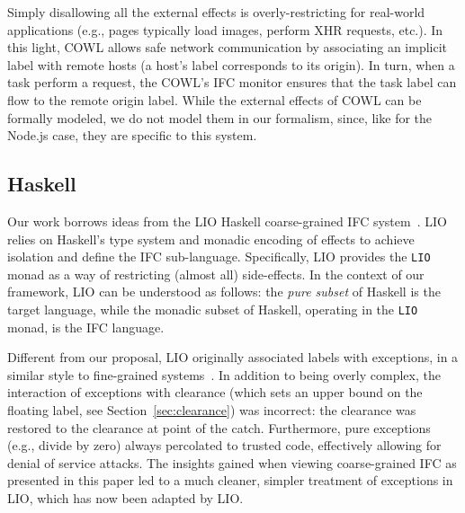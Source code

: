Simply disallowing all the external effects is overly-restricting for
real-world applications (e.g., pages typically load images, perform
XHR requests, etc.).
%
In this light, COWL allows safe network communication by associating an
implicit label with remote hosts (a host's label corresponds to
its origin).
%
In turn, when a task perform a request, the COWL's IFC monitor
ensures that the task label can flow to the remote origin label.
%
While the external effects of COWL can be formally modeled, we do not
model them in our formalism, %
since, like for the
Node.js case, they are specific to this system.
%



\subsection{Haskell}
\label{sec:real:hs}
Our work borrows ideas from the LIO Haskell coarse-grained IFC
system~\cite{lio, stefan:addressing-covert}.
%
LIO relies on Haskell's type system and monadic encoding of
effects to achieve isolation and define the IFC sub-language.
%
Specifically, LIO provides the \verb|LIO| monad as a way of restricting
(almost all) side-effects.
%
In the context of our framework, LIO can be understood as follows: the
\emph{pure subset} of Haskell is the target language, while the
monadic subset of Haskell, operating in the \verb|LIO| monad, is the
IFC language.

%
Different from our proposal, LIO originally associated labels with exceptions, in a
similar style to fine-grained
systems~\cite{stefan:2012:arxiv-flexible, Hritcu:2013:YIB:2497621.2498098}.
%
In addition to being overly complex, the interaction of exceptions
with clearance (which sets an upper bound on the floating label, see
Section~\ref{sec:clearance}) was incorrect: the clearance
was restored to the clearance at point of the catch.
%
Furthermore, pure exceptions (e.g., divide by zero) always percolated to
trusted code, effectively allowing for denial of service attacks.
%
The insights gained when viewing coarse-grained IFC as presented in this
paper led to a much cleaner, simpler treatment of exceptions in LIO,
which has now been adapted by LIO.






